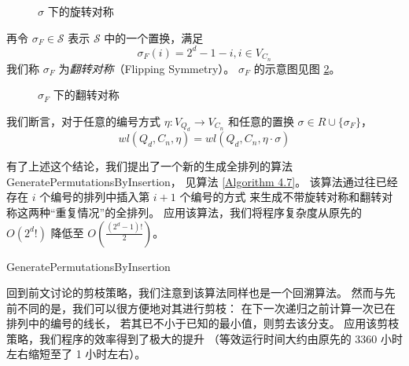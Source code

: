 \begin{figure}[h!]
	\centering
	
	\caption{$\sigma$ 下的旋转对称}
	\label{Figure 4-1}
\end{figure}

再令 $\sigma_F \in \mathcal{S}$ 表示 $\mathcal{S}$ 中的一个置换，满足
\begin{equation*}
\sigma_F(i) = 2^d - 1 - i, i \in V_{C_n}
\end{equation*}
我们称 $\sigma_F$ 为\emph{翻转对称}（Flipping Symmetry）。
$\sigma_F$ 的示意图见图 \ref{Figure 4-2}。

\begin{figure}[h!]
	\centering
	
	\caption{$\sigma_F$ 下的翻转对称}
	\label{Figure 4-2}
\end{figure}

我们断言，对于任意的编号方式 $\eta \colon V_{Q_d} \rightarrow V_{C_n}$
和任意的置换 $\sigma \in R \cup \{\sigma_F\}$，
\begin{equation*}
wl(Q_d, C_n, \eta) = wl(Q_d, C_n, \eta \cdot \sigma)
\end{equation*}

有了上述这个结论，我们提出了一个新的生成全排列的算法 GeneratePermutationsByInsertion，
见算法 \ref{Algorithm 4.7}。
该算法通过往已经存在 $i$ 个编号的排列中插入第 $i + 1$ 个编号的方式
来生成不带旋转对称和翻转对称这两种“重复情况”的全排列。
应用该算法，我们将程序复杂度从原先的 $O(2^d !)$ 降低至 $O(\frac{(2^d - 1)!}{2})$。

\begin{algorithm}
\caption{GeneratePermutationsByInsertion}
\label{Algorithm 4.7}
\begin{algorithmic}[1]
	 
	 

		 
	\Else
			 
				 
			\EndIf
		\EndFor
	\EndIf
\end{algorithmic}
\end{algorithm}

回到前文讨论的剪枝策略，我们注意到该算法同样也是一个回溯算法。
然而与先前不同的是，我们可以很方便地对其进行剪枝：
在下一次递归之前计算一次已在排列中的编号的线长，
若其已不小于已知的最小值，则剪去该分支。
应用该剪枝策略，我们程序的效率得到了极大的提升
（等效运行时间大约由原先的 3360 小时左右缩短至了 1 小时左右）。


